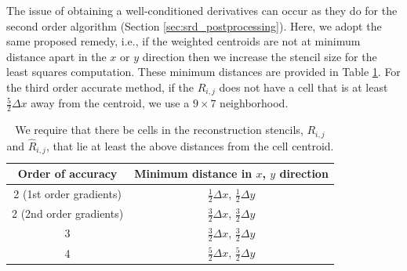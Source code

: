 The issue of obtaining a well-conditioned derivatives can occur as they do for the second order algorithm (Section \ref{sec:srd_postprocessing}).  Here, we adopt the same proposed remedy, i.e., if the weighted centroids are not at minimum distance apart in the $x$ or $y$ direction then we increase the stencil size for the least squares computation.  These minimum distances are provided in Table \ref{tab:mindist}.  For the third order accurate method, if the $ R_{i,j}$ does not have a cell that is at least $\frac{5}{2}\Delta x$ away from the centroid, we use a $9 \times 7$ neighborhood.
\begin{table}
	\centering
	\begin{tabular}{|c|c|}
		\hline 
		Order of accuracy & Minimum distance in $x$, $y$ direction
                    \\[.08in] \hline 
		2 (1st order gradients)  & $\frac{1}{2}\Delta x$,
                    $\frac{1}{2}\Delta y$ \\[.08in] \hline 
		2 (2nd order gradients)  & $\frac{3}{2}\Delta x$, 
                     $\frac{3}{2}\Delta y$ \\ [.08in] \hline 
		3 & $\frac{3}{2}\Delta x$, $\frac{3}{2}\Delta y$ \\
                   [.08in] \hline
		4 & $\frac{5}{2}\Delta x$, $\frac{5}{2}\Delta y$ \\ [.08in] \hline 
	\end{tabular}  
	\caption{We require that there be cells in the reconstruction stencils, $R_{i,j}$ and $\widehat R_{i,j}$, that lie at least the above distances from the cell centroid.} \label{tab:mindist}
\end{table}

